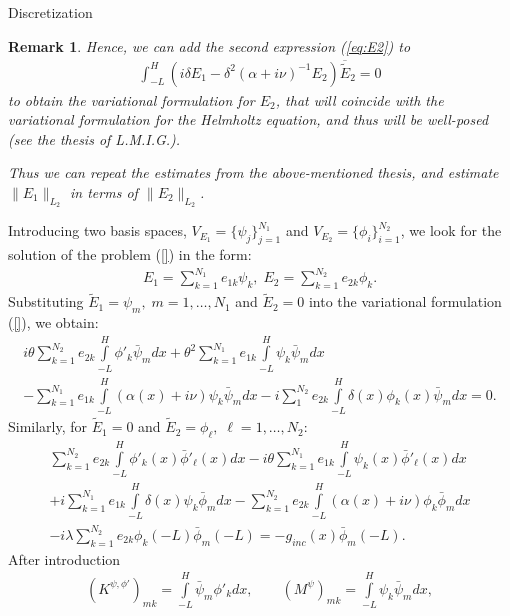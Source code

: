 \documentclass[11pt]{amsart}
\newtheorem{remark}{Remark}
\begin{document}
\begin{subsection}{Discretization}
\begin{remark}
Hence, we can add the second expression (\ref{eq:E2}) to
\begin{align*}
\int_{-L}^{H}\left(i\delta E_{1}-\delta^2(\alpha+i\nu)^{-1} E_{2}\right)\overline{\tilde E}_{2}=0
\end{align*}
to obtain the variational formulation for $E_{2}$, that will coincide with the variational formulation for the Helmholtz equation, and thus will be well-posed (see the thesis of L.M.I.G.).

Thus we can repeat the estimates from the above-mentioned thesis, and estimate $\|E_{1}\|_{L_{2}}$ in terms of $\|E_{2}\|_{L_{2}}$.
\end{remark}



Introducing two basis spaces, $V_{E_{1}}=\{\psi_{j}\}_{j=1}^{N_{1}}$ and $V_{E_{2}}=\{\phi_{i}\}_{i=1}^{N_{2}}$, we look for the solution of the problem (\ref{}) in the form:
\begin{align*}
E_{1}=\sum\limits_{k=1}^{N_{1}}e_{1k}\psi_{k},\; E_{2}=\sum\limits_{k=1}^{N_{2}}e_{2k}\phi_{k}.
\end{align*}
Substituting $\tilde{E}_{1}=\psi_{m}, \; m=1,\ldots,N_{1}$ and $\tilde{E}_{2}=0$ into the variational formulation (\ref{}), we obtain:
\begin{align*}
i\theta\sum\limits_{k=1}^{N_{2}}e_{2k}\int\limits_{-L}^{H}\phi'_{k}\bar{\psi}_{m}dx+\theta^2\sum\limits_{k=1}^{N_{1}}e_{1k}\int\limits_{-L}^{H}\psi_{k}\bar{\psi}_{m}dx\\
-\sum\limits_{k=1}^{N_{1}}e_{1k}\int\limits_{-L}^{H}(\alpha(x)+i\nu)\psi_{k}\bar{\psi}_{m}dx-i\sum\limits_{1}^{N_{2}}e_{2k}\int\limits_{-L}^{H}\delta(x)\phi_{k}(x)\bar{\psi}_{m}dx=0.
\end{align*}
Similarly, for $\tilde{E}_{1}=0$ and $\tilde{E}_{2}=\phi_{\ell},\; \ell=1,\ldots, N_{2}$:
\begin{align*}
\sum\limits_{k=1}^{N_{2}}e_{2k}\int\limits_{-L}^{H}\phi'_{k}(x)\bar{\phi}'_{\ell}(x)dx-i\theta\sum\limits_{k=1}^{N_{1}}e_{1k}\int\limits_{-L}^{H}\psi_{k}(x)\bar{\phi}'_{\ell}(x)dx\\
+i
\sum\limits_{k=1}^{N_{1}}e_{1k}\int\limits_{-L}^{H}\delta(x)\psi_{k}\bar{\phi}_{m}dx-\sum\limits_{k=1}^{N_{2}}e_{2k}\int\limits_{-L}^{H}(\alpha(x)+i\nu)\phi_{k}\bar{\phi}_{m}dx\\
-
i\lambda\sum\limits_{k=1}^{N_{2}}e_{2k}\phi_{k}(-L)\bar{\phi}_{m}(-L)=-g_{inc}(x)\bar{\phi}_{m}(-L).
\end{align*}
After introduction 
\begin{align*}
\left(K^{\psi,\phi'}\right)_{mk}=\int\limits_{-L}^{H}\bar{\psi}_{m}\phi'_{k}dx,\qquad \left(M^{\psi}\right)_{mk}=\int\limits_{-L}^{H}\psi_{k}\bar{\psi}_{m}dx,\\

\end{align*}
\end{subsection}
\end{document}
